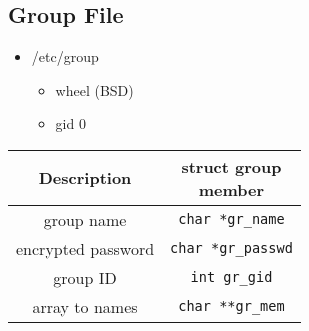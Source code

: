 \documentclass[10pt]{article}
\begin{document}
\begin{multicols}{2}
\begin{minipage}{\columnwidth}
        \subsection*{Group File}
        \begin{multicols*}{2}
            \begin{minipage}{0.5\columnwidth}
                \begin{itemize}[leftmargin=*]
                    \setlength{\itemsep}{0em}
                    \item /etc/group
                          \begin{itemize}
                              \item wheel (BSD)
                              \item gid 0
                          \end{itemize}
                \end{itemize}
            \end{minipage}
            \columnbreak
            \begin{minipage}{0.3\columnwidth}
                \begin{tabular}{|c|c|}
                    \hline
                    Description        & \makecell{struct group      \\member} \\
                    \hline \hline
                    group name         & \lstinline|char *gr_name|   \\
                    encrypted password & \lstinline|char *gr_passwd| \\
                    group ID           & \lstinline|int gr_gid|      \\
                    array to names     & \lstinline|char **gr_mem|   \\
                    \hline
                \end{tabular}
            \end{minipage}
        \end{multicols*}

\end{minipage}
\end{multicols}
\end{document}
